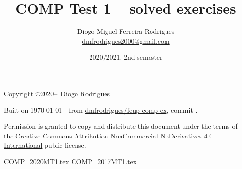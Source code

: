 \documentclass{comp}
\title{COMP Test 1 -- solved exercises}
\author{Diogo Miguel Ferreira Rodrigues \\ \href{mailto:dmfrodrigues2000@gmail.com}{dmfrodrigues2000@gmail.com}}
\date{2020/2021, 2nd semester}
\begin{document}
\maketitle
\begin{secondpage}
    Copyright \copyright 2020--\the\year\ Diogo Rodrigues\par
    \par
    \immediate{}
    Built on \today~\currenttime~from \href{https://github.com/dmfrodrigues/feup-comp-ex}{dmfrodrigues/feup-comp-ex}, commit \unskip.\par
    Permission is granted to copy and distribute this document under the terms of the
    \href{https://creativecommons.org/licenses/by-nc-nd/4.0/}{Creative Commons Attribution-NonCommercial-NoDerivatives 4.0 International}
    public license.
\end{secondpage}
\frontmatter
\tableofcontents
\mainmatter
{COMP_2020MT1.tex}
{COMP_2017MT1.tex}
\end{document}
